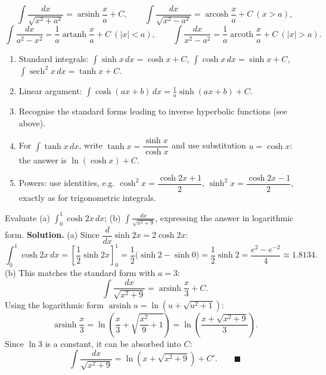 \documentclass[11pt]{article}
\begin{document}
\begin{propriete}
\[
\int\frac{dx}{\sqrt{x^{2}+a^{2}}} = \operatorname{arsinh}\frac{x}{a} + C,\qquad
\int\frac{dx}{\sqrt{x^{2}-a^{2}}} = \operatorname{arcosh}\frac{x}{a} + C\ (x>a),
\]
\[
\int\frac{dx}{a^{2}-x^{2}} = \frac{1}{a}\operatorname{artanh}\frac{x}{a} + C\ (|x|<a),\qquad
\int\frac{dx}{x^{2}-a^{2}} = \frac{1}{a}\operatorname{arcoth}\frac{x}{a} + C\ (|x|>a).
\]
\end{propriete}

\begin{methode}
\begin{enumerate}
\item Standard integrals: $\int\sinh x\,dx=\cosh x+C$, $\int\cosh x\,dx=\sinh x+C$, $\int\operatorname{sech}^{2}x\,dx=\tanh x+C$.
\item Linear argument: $\displaystyle\int\cosh(ax+b)\,dx=\frac{1}{a}\sinh(ax+b)+C$.
\item Recognise the standard forms leading to inverse hyperbolic functions (see above).
\item For $\int\tanh x\,dx$, write $\tanh x=\dfrac{\sinh x}{\cosh x}$ and use substitution $u=\cosh x$: the answer is $\ln(\cosh x)+C$.
\item Powers: use identities, e.g. $\cosh^{2}x=\dfrac{\cosh 2x+1}{2}$, $\sinh^{2}x=\dfrac{\cosh 2x-1}{2}$, exactly as for trigonometric integrals.
\end{enumerate}
\end{methode}

\begin{exoresolu}
Evaluate (a) $\displaystyle\int_{0}^{1}\cosh 2x\,dx$; \quad (b) $\displaystyle\int\frac{dx}{\sqrt{x^{2}+9}}$, expressing the answer in logarithmic form.
\tcblower
\textbf{Solution.} (a) Since $\dfrac{d}{dx}\sinh 2x=2\cosh 2x$:
\[ \int_{0}^{1}\cosh 2x\,dx=\left[\frac{1}{2}\sinh 2x\right]_{0}^{1}=\frac{1}{2}\bigl(\sinh 2-\sinh 0\bigr)=\frac{1}{2}\sinh 2=\frac{e^{2}-e^{-2}}{4}\approx 1.8134. \]
(b) This matches the standard form with $a=3$:
\[ \int\frac{dx}{\sqrt{x^{2}+9}}=\operatorname{arsinh}\frac{x}{3}+C. \]
Using the logarithmic form $\operatorname{arsinh}u=\ln\!\left(u+\sqrt{u^{2}+1}\right)$:
\[ \operatorname{arsinh}\frac{x}{3}=\ln\!\left(\frac{x}{3}+\sqrt{\frac{x^{2}}{9}+1}\right)=\ln\!\left(\frac{x+\sqrt{x^{2}+9}}{3}\right). \]
Since $\ln 3$ is a constant, it can be absorbed into $C$:
\[ \int\frac{dx}{\sqrt{x^{2}+9}}=\ln\!\left(x+\sqrt{x^{2}+9}\right)+C'. \qquad\blacksquare \]
\end{exoresolu}
\end{document}
